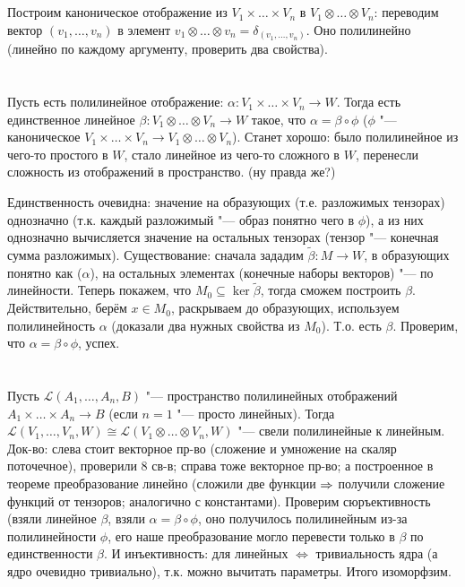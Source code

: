 \section{} %
Построим каноническое отображение из $V_1 \times \dots \times V_n$ в $V_1 \otimes \dots \otimes V_n$:
переводим вектор $(v_1, \dots, v_n)$ в элемент $v_1\otimes\dots\otimes v_n=\delta_{(v_1, \dots, v_n)}$.
Оно полилинейно (линейно по каждому аргументу, проверить два свойства).

\section{} %
Пусть есть полилинейное отображение: $\alpha \colon V_1 \times \dots \times V_n \to W$.
Тогда есть единственное линейное $\beta \colon V_1 \otimes \dots \otimes V_n \to W$ такое,
что $\alpha = \beta \circ \phi$ ($\phi$ "--- каноническое $V_1 \times \dots \times V_n \to  V_1 \otimes \dots \otimes V_n$).
Станет хорошо: было полилинейное из чего-то простого в $W$, стало линейное из чего-то сложного в $W$,
перенесли сложность из отображений в пространство. (\TODO ну правда же?)

Единственность очевидна: значение на образующих (т.е. разложимых тензорах) однозначно (т.к. каждый
разложимый "--- образ понятно чего в $\phi$), а из них однозначно вычисляется значение на остальных
тензорах (тензор "--- конечная сумма разложимых).
Существование: сначала зададим $\tilde\beta \colon M \to W$, в образующих понятно как ($\alpha$),
на остальных элементах (конечные наборы векторов) "--- по линейности.
Теперь покажем, что $M_0 \subseteq \ker \tilde\beta$, тогда сможем построить $\beta$.
Действительно, берём $x \in M_0$, раскрываем до образующих, используем полилинейность
$\alpha$ (доказали два нужных свойства из $M_0$).
Т.о. есть $\beta$.
Проверим, что $\alpha = \beta \circ \phi$, успех.

\section{} %
Пусть $\mathcal L(A_1, \dots, A_n, B)$ "--- пространство полилинейных отображений $A_1 \times \dots \times A_n \to B$
(если $n=1$ "--- просто линейных).
Тогда $\mathcal L(V_1, \dots, V_n, W) \cong \mathcal L (V_1 \otimes \dots \otimes V_n, W)$ "--- свели полилинейные к линейным.
Док-во: слева стоит векторное пр-во (сложение и умножение на скаляр поточечное), проверили 8 св-в;
справа тоже векторное пр-во; а построенное в теореме преобразование линейно (сложили две функции $\Rightarrow$
получили сложение функций от тензоров; аналогично с константами).
Проверим сюръективность (взяли линейное $\beta$, взяли $\alpha=\beta \circ \phi$, оно получилось
полилинейным из-за полилинейности $\phi$, его наше преобразование могло перевести только в $\beta$ по единственности
$\beta$.
И инъективность: для линейных $\iff$ тривиальность ядра (а ядро очевидно тривиально),
т.к. можно вычитать параметры.
Итого изоморфзим.

\section{} %
\TODO

\section{} %
\TODO

\section{} %
\TODO
